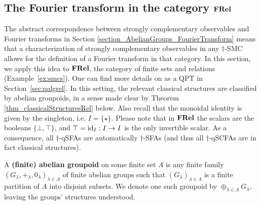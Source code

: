 \subsection{The Fourier transform in the category $\mathbf{FRel}$}
\label{section_RelFT}


The abstract correspondence between strongly complementary observables and Fourier transforms in Section \ref{section_AbelianGroups_FourierTransform} means that a characterization of strongly complementary observables in any $\dagger$-SMC allows for the definition of a Fourier transform in that category.  In this section, we apply this idea to $\mathbf{FRel}$, the category of finite sets and relations (Example~\ref{ex:smcs}). One can find more details on  as a QPT in Section~\ref{sec:qalgrel}. In this setting, the relevant classical structures are classified by abelian groupoids, in a sense made clear by Theorem \ref{thm_classicalStructuresRel} below. Also recall that the monoidal identity is given by the singleton, i.e. $I = \{\star\}$. Please note that in $\mathbf{FRel}$ the scalars are the booleans $\{\bot,\top\}$, and $\top = \mbox{id}_{I}: I \rightarrow I$ is the only invertible scalar. As a consequence, all $\dagger$-qSFAs are automatically $\dagger$-SFAs (and thus all $\dagger$-qSCFAs are in fact classical structures). 

\begin{defn}
A \textbf{(finite) abelian groupoid} on some finite set $A$ is any finite family $(G_\lambda,+_\lambda,0_\lambda)_{\lambda \in \Lambda}$ of finite abelian groups such that $(G_\lambda)_{\lambda \in \Lambda}$ is a finite partition of $A$ into disjoint subsets. We denote one such groupoid by $\oplus_{\lambda \in \Lambda} G_\lambda$, leaving the groups' structures understood.
\end{defn}

